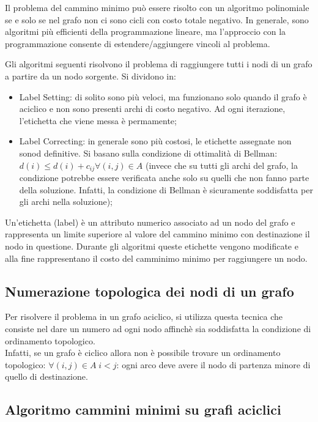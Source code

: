 \documentclass{article}
\begin{document}
Il problema del cammino minimo può essere risolto con un algoritmo polinomiale
se  e solo se nel grafo non ci sono cicli con costo totale negativo. In generale, 
sono algoritmi più efficienti della programmazione lineare, ma l'approccio con 
la programmazione consente di estendere/aggiungere vincoli al problema.

Gli algoritmi seguenti risolvono il problema di raggiungere tutti i nodi di un 
grafo a partire da un nodo sorgente. Si dividono in:

\begin{itemize}
  \item Label Setting: di solito sono più veloci, ma funzionano solo quando il 
    grafo è aciclico e non sono presenti archi di costo negativo. Ad ogni 
    iterazione, l'etichetta che viene messa è permamente;
  \item Label Correcting: in generale sono più costosi, le etichette assegnate 
    non sonod definitive. Si basano sulla condizione di ottimalità di Bellman:
    $d(i) \leq d(i) + c_{ij} \forall (i,j) \in A$ (invece che su tutti gli archi
    del grafo, la condizione potrebbe essere verificata anche solo su quelli che 
    non fanno parte della soluzione. Infatti, la condizione di Bellman è 
    sicuramente soddisfatta per gli archi nella soluzione);
\end{itemize}

Un'etichetta (label) è un attributo numerico associato ad un nodo del grafo e 
rappresenta un limite superiore al valore del cammino minimo con destinazione 
il nodo in questione. Durante gli algoritmi queste etichette vengono modificate 
e alla fine rappresentano il costo del camminimo minimo per raggiungere un nodo.

\subsection{Numerazione topologica dei nodi di un grafo}
Per risolvere il problema in un grafo aciclico, si utilizza questa tecnica che 
consiste nel dare un numero ad ogni nodo affinchè sia soddisfatta la condizione 
di ordinamento topologico.\\ Infatti, se un grafo è ciclico allora non è 
possibile trovare un ordinamento topologico: $\forall (i,j) \in A\; i<j$: ogni 
arco deve avere il nodo di partenza minore di quello di destinazione.


\subsection{Algoritmo cammini minimi su grafi aciclici}
\end{document}
